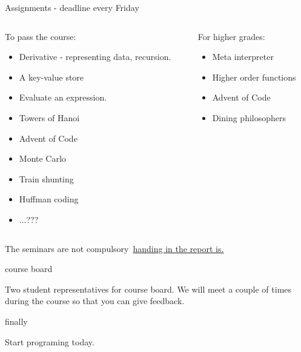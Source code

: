 \begin{frame}{Assignments - deadline every Friday}

\begin{columns}
 \begin{column}{0.6\linewidth}
   To pass the course:
   \begin{itemize}
   \item Derivative - representing data, recursion. 
   \item A key-value store
   \item Evaluate an expression. 
   \item Towers of Hanoi
   \item Advent of Code 
   \item Monte Carlo
   \item Train shunting 
   \item Huffman coding
   \item ...???
   \end{itemize}
 \end{column}
 \begin{column}{0.4\linewidth}

   \pause
   For higher grades:
   \begin{itemize}
   \item Meta interpreter
   \item Higher order functions
   \item Advent of Code
   \item Dining philosophers
   \end{itemize}

 \end{column}
\end{columns}

\pause \vspace{20pt}
The seminars are not compulsory\pause\ \underline{handing in the report is.}

\end{frame}


\begin{frame}{course board}

  Two student representatives for course board. We will meet a couple
  of times during the course so that you can give feedback.

\end{frame}


\begin{frame}{finally}

  \pause\vspace{60pt}\hspace{40pt} Start programing today.

\end{frame}


